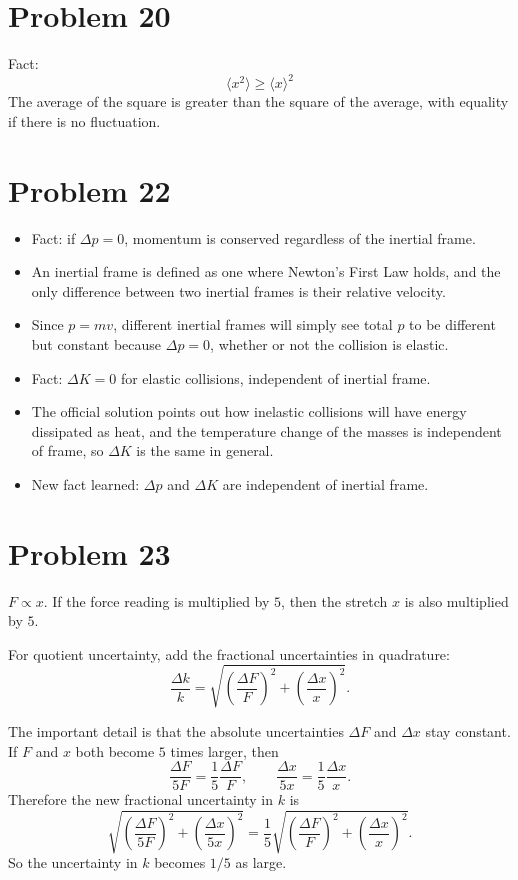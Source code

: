 \documentclass[11pt]{article}
\begin{document}
\section*{Problem 20}
Fact:
\[
\langle x^2\rangle\ge \langle x\rangle^2
\]
The average of the square is greater than the square of the average, with equality if there is no fluctuation.

\section*{Problem 22}
\begin{itemize}[leftmargin=1.5em]
    \item Fact: if $\Delta p=0$, momentum is conserved regardless of the inertial frame.
    \item An inertial frame is defined as one where Newton's First Law holds, and the only difference between two inertial frames is their relative velocity.
    \item Since $p=mv$, different inertial frames will simply see total $p$ to be different but constant because $\Delta p=0$, whether or not the collision is elastic.
    \item Fact: $\Delta K=0$ for elastic collisions, independent of inertial frame.
    \item The official solution points out how inelastic collisions will have energy dissipated as heat, and the temperature change of the masses is independent of frame, so $\Delta K$ is the same in general.
    \item New fact learned: $\Delta p$ and $\Delta K$ are independent of inertial frame.
\end{itemize}


\section*{Problem 23}
$F\propto x$. If the force reading is multiplied by $5$, then the stretch $x$ is also multiplied by $5$.

For quotient uncertainty, add the fractional uncertainties in quadrature:
\[
\frac{\Delta k}{k}=\sqrt{\left(\frac{\Delta F}{F}\right)^2+
\left(\frac{\Delta x}{x}\right)^2}.
\]

The important detail is that the absolute uncertainties $\Delta F$ and $\Delta x$ stay constant. If $F$ and $x$ both become $5$ times larger, then
\[
\frac{\Delta F}{5F}=\frac{1}{5}\frac{\Delta F}{F},
\qquad
\frac{\Delta x}{5x}=\frac{1}{5}\frac{\Delta x}{x}.
\]
Therefore the new fractional uncertainty in $k$ is
\[
\sqrt{\left(\frac{\Delta F}{5F}\right)^2+
\left(\frac{\Delta x}{5x}\right)^2}
=\frac{1}{5}
\sqrt{\left(\frac{\Delta F}{F}\right)^2+
\left(\frac{\Delta x}{x}\right)^2}.
\]
So the uncertainty in $k$ becomes $1/5$ as large.
\end{document}
